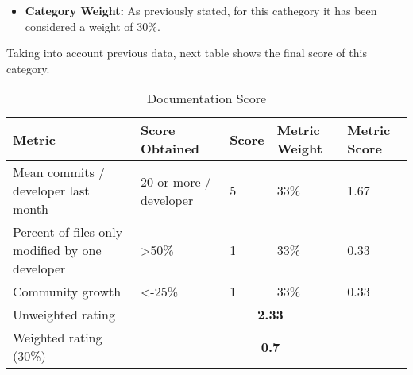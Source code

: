 \documentclass[11pt]{article}
\newcommand{\mysqlcmd}[1]{\\\indent\indent\texttt{mysql> #1}\\}
\begin{document}
\begin{itemize}
\begin{itemize}
\begin{verbatim}
\end{verbatim}
Resulting score is, as demonstrated above 2230/4215 = 0.529, which gives an score of "more than 50\% of the files".
Last, but not least, it must be calculated how community has grown or abated on last year. To do so, the number of committers on 2012 has been calculated with next query:
\mysqlcmd{select DISTINCT(p.email) as "Number of Commits" from scmlog s, people p WHERE YEAR(s.date)='2012' AND s.committer\_id=p.id;}
This query gives a resulting number equal to:
\begin{verbatim}
+--------------------------+
| Number of Commits        |
+--------------------------+
| rubensm@dacya.ucm.es     |
...
| hector@convivencial.org  |
+--------------------------+
16 rows in set (0.02 sec)
\end{verbatim}
Later, the number of commiters in 2013 has been calculated by issuing next query:
\mysqlcmd{select DISTINCT(p.email) as "Number of Commits" from scmlog s, people p WHERE YEAR(s.date)='2013' AND s.committer\_id=p.id;}
This query gives a resulting number equal to:
\begin{verbatim}
+--------------------------+
| Number of Commits        |
+--------------------------+
| jfontan@gmail.com        |
...
| dmolina@c12g.com         |
+--------------------------+
9 rows in set (0.05 sec)
\end{verbatim}
With this information, it can be ensured that resulting score is, as demonstrated above, is a decrease of 7/16 =0.43 (43\%), what means a "decrease of more than 25\%".
\end{itemize}
\item{\textbf{Category Weight:}} As previously stated, for this cathegory it has been considered a weight of 30\%.
\end{itemize}
Taking into account previous data, next table shows the final score of this category.
\begin{table}[H]
  \begin{center}
    \begin{tabular}{ | p{4cm} | p{3cm} | l | p{1.2cm} | p{1.2cm} | }
    \hline
    \textbf{Metric} & \textbf{Score Obtained} & \textbf{Score} & \textbf{Metric Weight} & \textbf{Metric Score}\\
    \hline
    Mean commits / developer last month & 20 or more / developer & 5 & 33\% & 1.67\\
    \hline
    Percent of files only modified by one developer & \textgreater50\% & 1 & 33\% & 0.33\\
    \hline
    Community growth & \textless-25\% & 1 & 33\% & 0.33\\
    \hline
    Unweighted rating & \multicolumn{4}{c|}{\textbf{2.33}}\\
    \hline
    Weighted rating (30\%) & \multicolumn {4}{c|}{\textbf{0.7}}\\
    \hline
    \end{tabular}
    \caption{Documentation Score}
    \label{tab:docu_score}
  \end{center}
\end{table}
\end{document}
